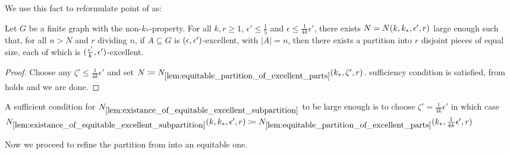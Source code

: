     We use this fact to reformulate point  of
     as:

    \begin{lemma}[Claim 5.13.2(3)] \label{lem:existance_of_equitable_excellent_subpartition}
        Let $G$ be a finite graph with the non-$k_*$-property.
        For all $k, r \geq 1$, $\epsilon' \leq \frac{1}{5}$ and $\epsilon \leq \frac{1}{4k} \epsilon'$, there exists
        $N = N( k, k_*, \epsilon', r )$ large enough such that, for all $n > N$ and $r$ dividing $n$,
        if $A \subseteq G$ is $( \epsilon, \epsilon' )$-excellent, with $|A| = n$, then there exists a
        partition into $r$ disjoint pieces of equal size, each of which is $( \frac{\epsilon'}{k}, \epsilon' )$-excellent.
        \begin{proof}
            Choose any $\zeta' \leq \frac{1}{4k} \epsilon'$ and set
            $N \coloneqq N_{\ref{lem:equitable_partition_of_excellent_parts}}( k_*, \zeta', r )$.
             sufficiency condition is satisfied,
             from 
            holds and we are done.
        \end{proof}
    \end{lemma}

    \begin{remark}
        A sufficient condition for $N_{\ref{lem:existance_of_equitable_excellent_subpartition}}$ to be large enough is
        to choose $\zeta' = \frac{1}{4k} \epsilon'$ in which case
        $N_{\ref{lem:existance_of_equitable_excellent_subpartition}}( k, k_*, \epsilon', r ) \coloneqq
        N_{\ref{lem:equitable_partition_of_excellent_parts}}( k_*, \frac{1}{4k} \epsilon', r )$
    \end{remark}

    Now we proceed to refine the partition from  into an equitable one.

